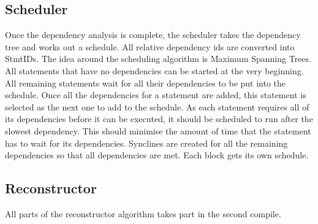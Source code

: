\subsection{Scheduler}
Once the dependency analysis is complete, the scheduler takes the dependency tree and works out a schedule. All relative dependency ids are converted into StmtIDs. The idea around the scheduling algorithm is Maximum Spanning Trees. All statements that have no dependencies can be started at the very beginning. All remaining statements wait for all their dependencies to be put into the schedule. Once all the dependencies for a statement are added, this statement is selected as the next one to add to the schedule. As each statement requires all of its dependencies before it can be executed, it should be scheduled to run after the slowest dependency. This should minimise the amount of time that the statement has to wait for its dependencies. Synclines are created for all the remaining dependencies so that all dependencies are met. Each block gets its own schedule.


\subsection{Reconstructor}
All parts of the reconstructor algorithm takes part in the second compile.

\begin{comment}
\begin{code}
\begin{verbatim}
let a; // Local without init
a = {
    let b = vec![1,2,3]; // Local with init
    println!("{:?}", b); // Mac
    b.len() // Expr
}; // Semi
\end{verbatim}
\caption{Example showing different StmtKinds}
\end{code}
\end{comment}
